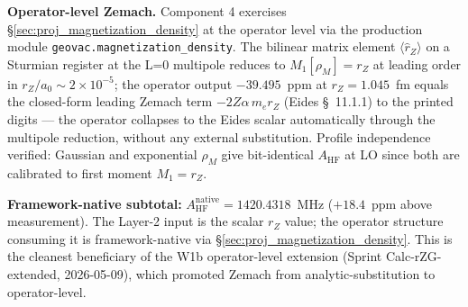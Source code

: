 \documentclass[11pt]{article}
\begin{document}
\textbf{Operator-level Zemach.}  Component 4 exercises
\S\ref{sec:proj_magnetization_density} at the operator level via the
production module \texttt{geovac.magnetization\_density}.  The bilinear
matrix element $\langle \hat{r}_Z\rangle$ on a Sturmian register at
the L=0 multipole reduces to $M_1[\rho_M] = r_Z$ at leading order in
$r_Z/a_0 \sim 2\times 10^{-5}$; the operator output $-39.495$~ppm at
$r_Z = 1.045$~fm equals the closed-form leading Zemach term
$-2Z\alpha\, m_e r_Z$ (Eides \S~11.1.1) to the printed digits --- the
operator collapses to the Eides scalar
automatically through the multipole reduction, without any external
substitution.  Profile independence verified: Gaussian and exponential
$\rho_M$ give bit-identical $A_\text{HF}$ at LO since both are
calibrated to first moment $M_1 = r_Z$.

\textbf{Framework-native subtotal:} $A_\text{HF}^\text{native}\!=\!1420.4318$~MHz
($+18.4$~ppm above measurement).  The Layer-2 input is the scalar $r_Z$
value; the operator structure consuming it is framework-native via
\S\ref{sec:proj_magnetization_density}.  This is the cleanest
beneficiary of the W1b operator-level extension (Sprint
Calc-rZG-extended, 2026-05-09), which promoted Zemach from
analytic-substitution to operator-level.
\end{document}

